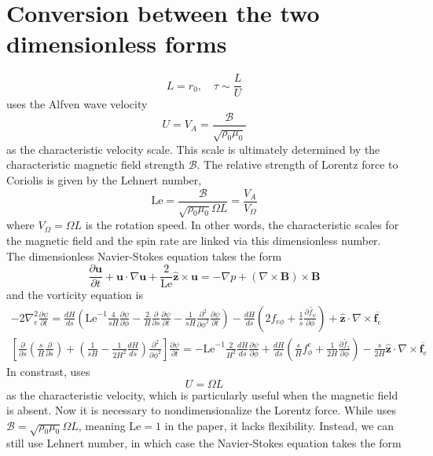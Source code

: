 \section{Conversion between the two dimensionless forms}

\[L = r_0,\quad \tau \sim \frac{L}{U}\]
\textcite{holdenried-chernoff_long_2021} uses the Alfven wave velocity
\[U = V_A = \frac{\mathscr{B}}{\sqrt{\rho_0 \mu_0}}\]
as the characteristic velocity scale. This scale is ultimately determined by the characteristic magnetic field strength $\mathscr{B}$. The relative strength of Lorentz force to Coriolis is given by the Lehnert number,
\[\mathrm{Le} = \frac{\mathscr{B}}{\sqrt{\rho_0 \mu_0}\Omega L} = \frac{V_A}{V_\Omega}\]
where $V_\Omega = \Omega L$ is the rotation speed. In other words, the characteristic scales for the magnetic field and the spin rate are linked via this dimensionless number. The dimensionless Navier-Stokes equation takes the form
\[
    \frac{\partial \mathbf{u}}{\partial t} + \mathbf{u}\cdot \nabla \mathbf{u} + \frac{2}{\mathrm{Le}}\hat{\mathbf{z}}\times \mathbf{u} = -\nabla p + (\nabla\times\mathbf{B})\times \mathbf{B}
\]
and the vorticity equation is
\[\begin{gathered}
    -2\nabla_e^2 \frac{\partial \psi}{\partial t} = \frac{dH}{ds} \left(\mathrm{Le}^{-1}\frac{4}{sH}\frac{\partial \psi}{\partial \phi} - \frac{2}{H}\frac{\partial}{\partial s}\frac{\partial \psi}{\partial t} - \frac{1}{sH}\frac{\partial^2}{\partial \phi^2}\frac{\partial \psi}{\partial t}\right) - \frac{dH}{ds}\left(2f_{e\phi} + \frac{1}{s}\frac{\partial \widetilde{f_\phi}}{\partial \phi}\right) + \hat{\mathbf{z}}\cdot \nabla\times \overline{\mathbf{f}_e} \\ 
    \left[\frac{\partial}{\partial s}\left(\frac{s}{H}\frac{\partial}{\partial s}\right) + \left(\frac{1}{sH} - \frac{1}{2H^2} \frac{dH}{ds}\right)\frac{\partial^2}{\partial \phi^2}\right] \frac{\partial \psi}{\partial t} = - \mathrm{Le}^{-1}\frac{2}{H^2}\frac{dH}{ds} \frac{\partial \psi}{\partial \phi} + \frac{dH}{ds} \left(\frac{s}{H} f_\phi^e + \frac{1}{2H}\frac{\partial \widetilde{f_z}}{\partial \phi}\right) - \frac{s}{2H}\hat{\mathbf{z}}\cdot \nabla\times \overline{\mathbf{f}_e}
\end{gathered}
\]
In constrast, \textcite{jackson_plesio-geostrophy_2020} uses 
\[U = \Omega L\]
as the characteristic velocity, which is particularly useful when the magnetic field is absent. Now it is necessary to nondimensionalize the Lorentz force. While \textcite{jackson_plesio-geostrophy_2020} uses $\mathscr{B} = \sqrt{\rho_0 \mu_0} \Omega L$, meaning $\mathrm{Le} = 1$ in the paper, it lacks flexibility. Instead, we can still use Lehnert number, in which case the Navier-Stokes equation takes the form
